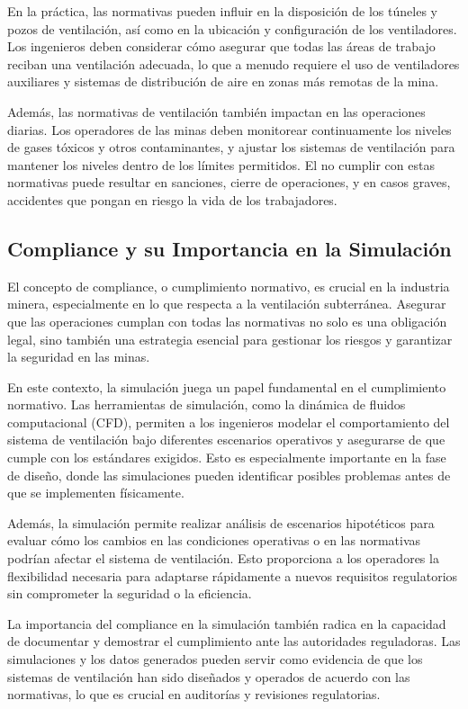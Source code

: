 En la práctica, las normativas pueden influir en la disposición de los túneles y pozos de ventilación, así como en la ubicación y configuración de los ventiladores. Los ingenieros deben considerar cómo asegurar que todas las áreas de trabajo reciban una ventilación adecuada, lo que a menudo requiere el uso de ventiladores auxiliares y sistemas de distribución de aire en zonas más remotas de la mina.

Además, las normativas de ventilación también impactan en las operaciones diarias. Los operadores de las minas deben monitorear continuamente los niveles de gases tóxicos y otros contaminantes, y ajustar los sistemas de ventilación para mantener los niveles dentro de los límites permitidos. El no cumplir con estas normativas puede resultar en sanciones, cierre de operaciones, y en casos graves, accidentes que pongan en riesgo la vida de los trabajadores.

\subsection{Compliance y su Importancia en la Simulación}

El concepto de compliance, o cumplimiento normativo, es crucial en la industria minera, especialmente en lo que respecta a la ventilación subterránea. Asegurar que las operaciones cumplan con todas las normativas no solo es una obligación legal, sino también una estrategia esencial para gestionar los riesgos y garantizar la seguridad en las minas.

En este contexto, la simulación juega un papel fundamental en el cumplimiento normativo. Las herramientas de simulación, como la dinámica de fluidos computacional (CFD), permiten a los ingenieros modelar el comportamiento del sistema de ventilación bajo diferentes escenarios operativos y asegurarse de que cumple con los estándares exigidos. Esto es especialmente importante en la fase de diseño, donde las simulaciones pueden identificar posibles problemas antes de que se implementen físicamente.

Además, la simulación permite realizar análisis de escenarios hipotéticos para evaluar cómo los cambios en las condiciones operativas o en las normativas podrían afectar el sistema de ventilación. Esto proporciona a los operadores la flexibilidad necesaria para adaptarse rápidamente a nuevos requisitos regulatorios sin comprometer la seguridad o la eficiencia.

La importancia del compliance en la simulación también radica en la capacidad de documentar y demostrar el cumplimiento ante las autoridades reguladoras. Las simulaciones y los datos generados pueden servir como evidencia de que los sistemas de ventilación han sido diseñados y operados de acuerdo con las normativas, lo que es crucial en auditorías y revisiones regulatorias.

